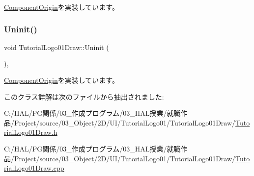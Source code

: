 \mbox{\hyperlink{class_component_origin_a9f674891257f2272b1636d8b6bb05d81}{Component\+Origin}}を実装しています。

\mbox{\label{class_tutorial_logo01_draw_ab27500ea1511726097dc9f81cefb9632}} 
\subsubsection{\texorpdfstring{Uninit()}{Uninit()}}
{\footnotesize\ttfamily void Tutorial\+Logo01\+Draw\+::\+Uninit (\begin{DoxyParamCaption}{ }\end{DoxyParamCaption})\hspace{0.3cm}{\ttfamily [override]}, {\ttfamily [virtual]}}



\mbox{\hyperlink{class_component_origin_a9f89a93f9c1954bd53f9750e35e6089d}{Component\+Origin}}を実装しています。



このクラス詳解は次のファイルから抽出されました\+:\begin{DoxyCompactItemize}
\item 
C\+:/\+H\+A\+L/\+P\+G関係/03\+\_\+作成プログラム/03\+\_\+\+H\+A\+L授業/就職作品/\+Project/source/03\+\_\+\+Object/2\+D/\+U\+I/\+Tutorial\+Logo01/\+Tutorial\+Logo01\+Draw/\mbox{\hyperlink{_tutorial_logo01_draw_8h}{Tutorial\+Logo01\+Draw.\+h}}\item 
C\+:/\+H\+A\+L/\+P\+G関係/03\+\_\+作成プログラム/03\+\_\+\+H\+A\+L授業/就職作品/\+Project/source/03\+\_\+\+Object/2\+D/\+U\+I/\+Tutorial\+Logo01/\+Tutorial\+Logo01\+Draw/\mbox{\hyperlink{_tutorial_logo01_draw_8cpp}{Tutorial\+Logo01\+Draw.\+cpp}}\end{DoxyCompactItemize}
